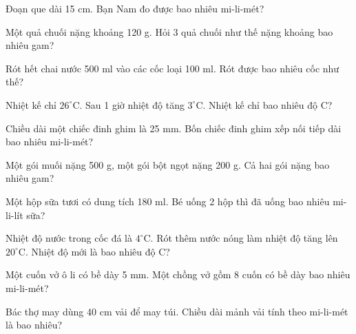 \begin{ex}
Đoạn que dài 15 cm. Bạn Nam đo được bao nhiêu mi-li-mét?
\end{ex}

\begin{ex}
Một quả chuối nặng khoảng 120 g. Hỏi 3 quả chuối như thế nặng khoảng bao nhiêu gam?
\end{ex}

\begin{ex}
Rót hết chai nước 500 ml vào các cốc loại 100 ml. Rót được bao nhiêu cốc như thế?
\end{ex}

\begin{ex}
Nhiệt kế chỉ $26^\circ$C. Sau 1 giờ nhiệt độ tăng $3^\circ$C. Nhiệt kế chỉ bao nhiêu độ C?
\end{ex}

\begin{ex}
Chiều dài một chiếc đinh ghim là 25 mm. Bốn chiếc đinh ghim xếp nối tiếp dài bao nhiêu mi-li-mét?
\end{ex}

\begin{ex}
Một gói muối nặng 500 g, một gói bột ngọt nặng 200 g. Cả hai gói nặng bao nhiêu gam?
\end{ex}

\begin{ex}
Một hộp sữa tươi có dung tích 180 ml. Bé uống 2 hộp thì đã uống bao nhiêu mi-li-lít sữa?
\end{ex}

\begin{ex}
Nhiệt độ nước trong cốc đá là $4^\circ$C. Rót thêm nước nóng làm nhiệt độ tăng lên $20^\circ$C. Nhiệt độ mới là bao nhiêu độ C?
\end{ex}

\begin{ex}
Một cuốn vở ô li có bề dày 5 mm. Một chồng vở gồm 8 cuốn có bề dày bao nhiêu mi-li-mét?
\end{ex}

\begin{ex}
Bác thợ may dùng 40 cm vải để may túi. Chiều dài mảnh vải tính theo mi-li-mét là bao nhiêu?
\end{ex}

